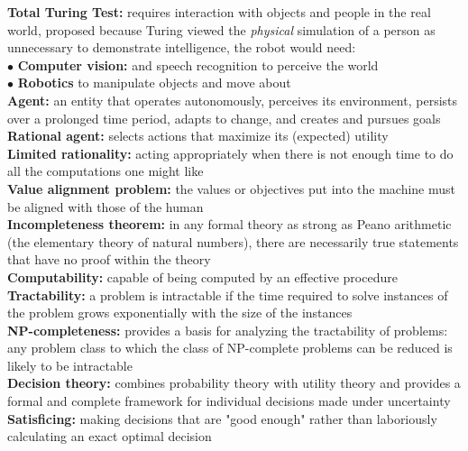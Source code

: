     \textbf{Total Turing Test:} requires interaction with objects and people in the real world, proposed because Turing viewed the \textit{physical} simulation of a person as unnecessary to demonstrate intelligence,
    the robot would need: \\
    $\bullet$ \textbf{Computer vision:} and speech recognition to perceive the world \\
    $\bullet$ \textbf{Robotics} to manipulate objects and move about \\
    \textbf{Agent:} an entity that operates autonomously, perceives its environment, persists over a prolonged time period, adapts to change, and creates and pursues goals \\
    \textbf{Rational agent:} selects actions that maximize its (expected) utility \\
    \textbf{Limited rationality:} acting appropriately when there is not enough time to do all the computations one might like \\
    \textbf{Value alignment problem:} the values or objectives put into the machine must be aligned with those of the human \\
    \textbf{Incompleteness theorem:} in any formal theory as strong as Peano arithmetic (the elementary theory of natural numbers), there are necessarily true statements that have no proof within the theory \\
    \textbf{Computability:} capable of being computed by an effective procedure \\
    \textbf{Tractability:} a problem is intractable if the time required to solve instances of the problem grows exponentially with the size of the instances \\
    \textbf{NP-completeness:} provides a basis for analyzing the tractability of problems: any problem class to which the class of NP-complete problems can be reduced is likely to be intractable \\
    \textbf{Decision theory:} combines probability theory with utility theory and provides a formal and complete framework for individual decisions made under uncertainty \\
    \textbf{Satisficing:} making decisions that are "good enough" rather than laboriously calculating an exact optimal decision \\

